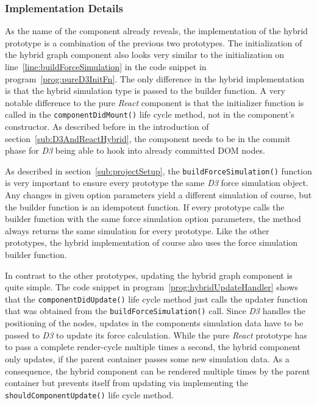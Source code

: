 \subsubsection{Implementation Details}

As the name of the component already reveals, the implementation of the hybrid prototype is a combination of the previous two prototypes. The initialization of the hybrid graph component also looks very similar to the initialization on line~\ref{line:buildForceSimulation} in the code snippet in program~\ref{prog:pureD3InitFn}. The only difference in the hybrid implementation is that the hybrid simulation type is passed to the builder function. A very notable difference to the pure \emph{React} component is that the initializer function is called in the \texttt{componentDidMount()} life cycle method, not in the component's constructor. As described before in the introduction of section~\ref{sub:D3AndReactHybrid}, the component needs to be in the commit phase for \emph{D3} being able to hook into already committed DOM nodes.

As described in section~\ref{sub:projectSetup}, the \texttt{buildForceSimulation()} function is very important to ensure every prototype the same \emph{D3} force simulation object. Any changes in given option parameters yield a different simulation of course, but the builder function is an idempotent function. If every prototype calls the builder function with the same force simulation option parameters, the method always returns the same simulation for every prototype. Like the other prototypes, the hybrid implementation of course also uses the force simulation builder function.

In contrast to the other prototypes, updating the hybrid graph component is quite simple. The code snippet in program~\ref{prog:hybridUpdateHandler} shows that the \texttt{componentDidUpdate()} life cycle method just calls the updater function that was obtained from the \texttt{build\-Force\-Simulation()} call. Since \emph{D3} handles the positioning of the nodes, updates in the components simulation data have to be passed to \emph{D3} to update its force calculation. While the pure \emph{React} prototype has to pass a complete render-cycle multiple times a second, the hybrid component only updates, if the parent container passes some new simulation data. As a consequence, the hybrid component can be rendered multiple times by the parent container but prevents itself from updating via implementing the \texttt{shouldComponentUpdate()} life cycle method.

